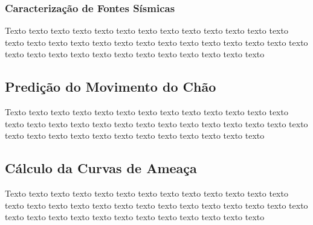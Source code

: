 \subsubsection{Caracterização de Fontes Sísmicas}
\label{sec:fontes}



Texto texto texto texto texto texto texto texto texto texto texto texto texto
texto texto texto texto texto texto texto texto texto texto texto texto texto
texto texto texto texto texto texto texto texto texto texto texto texto texto





\subsection{Predição do Movimento do Chão} 
\label{sec:gmpe}


Texto texto texto texto texto texto texto texto texto texto texto texto texto
texto texto texto texto texto texto texto texto texto texto texto texto texto
texto texto texto texto texto texto texto texto texto texto texto texto texto



\subsection{Cálculo da Curvas de Ameaça} 
\label{sec:curvas_de_ameaca}


Texto texto texto texto texto texto texto texto texto texto texto texto texto
texto texto texto texto texto texto texto texto texto texto texto texto texto
texto texto texto texto texto texto texto texto texto texto texto texto texto

